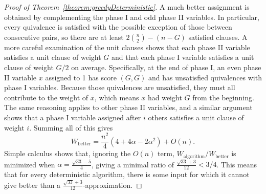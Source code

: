 \documentclass[11pt,letter]{article}
\numberwithin{theorem}{section}
\newcommand{\ol}{\overline}
\begin{document}
\begin{proof}[Proof of Theorem~\ref{theorem:greedyDeterministic}]
  A much better assignment is obtained by complementing
  the phase I and odd phase II variables.
  In particular, every quivalence is satisfied
  with the possible exception of those between consecutive pairs,
  so there are at least $2\binom{n}{2} - (n-G)$ satisfied clauses.
  A more careful examination of the unit clauses
  shows that each phase II variable satisfies a unit clause of weight $G$
  and that each phase I variable satisfies
  a unit clause of weight $G/2$ on average.
  Specifically, at the end of phase I,
  an even phase II variable $x$ assigned to 1 has score $(G,G)$
  and has unsatisfied quivalences with phase I variables.
  Because those quivalences are unsatisfied,
  they must all contribute to the weight of $\ol{x}$,
  which means $x$ had weight $G$ from the beginning.
  The same reasoning applies to other phase II variables,
  and a similar argument shows that a phase I variable assigned
  after $i$ others satisfies a unit clause of weight $i$.
  Summing all of this gives
  \[
    W_\textrm{better} = \frac{n^2}{4}(4 + 4\alpha - 2\alpha^2) + O(n).
  \]
  Simple calculus shows that, ignoring the $O(n)$ term,
  $W_\textrm{algorithm}/W_\textrm{better}$
  is minimized when $\alpha = \frac{\sqrt{33} - 5}{4}$,
  giving a minimal ratio of $\frac{\sqrt{33} + 3}{12} < 3/4$.
  This means that for every deterministic algorithm,
  there is some input for which it cannot give better than a
  $\frac{\sqrt{33} + 3}{12}$-approximation.
\end{proof}



\end{document}
